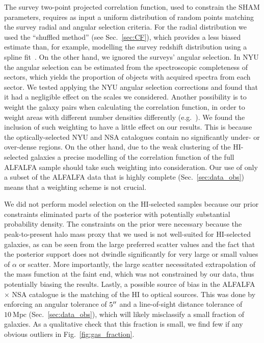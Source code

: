 \documentclass[usenatbib,useAMS]{mnras}
\newcommand{\HI}{\ensuremath{\mathrm{H}\scriptstyle\mathrm{I}}}
\newcommand{\matched}{ALFALFA $\times$ NSA }
\begin{document}
The survey two-point projected correlation function, used to constrain the \ac{SHAM} parameters, requires as input a uniform distribution of random points matching the survey radial and angular selection criteria. For the radial distribution we used the ``shuffled method'' (see Sec.~\ref{sec:CF}), which provides a less biased estimate than, for example, modelling the survey redshift distribution using a spline fit~\citep{Ross_et_al}. On the other hand, we ignored the surveys' angular selection. In \ac{NYU} the angular selection can be estimated from the spectroscopic completeness of sectors, which yields the proportion of objects with acquired spectra from each sector. We tested applying the \ac{NYU} angular selection corrections and found that it had a negligible effect on the scales we considered. Another possibility is to weight the galaxy pairs when calculating the correlation function, in order to weight areas with different number densities differently (e.g.~\citealt{Feldman}). We found the inclusion of such weighting to have a little effect on our results. This is because the optically-selected \ac{NYU} and \ac{NSA} catalogues contain no significantly under- or over-dense regions. On the other hand, due to the weak clustering of the $\HI$-selected galaxies a precise modelling of the correlation function of the full ALFALFA sample should take such weighting into consideration. Our use of only a subset of the ALFALFA data that is highly complete (Sec.~\ref{sec:data_obs}) means that a weighting scheme is not crucial.

We did not perform model selection on the $\HI$-selected samples because our prior constraints eliminated parts of the posterior with potentially substantial probability density. The constraints on the prior were necessary because the peak-to-present halo mass proxy that we used is not well-suited for $\HI$-selected galaxies, as can be seen from the large preferred scatter values and the fact that the posterior support does not dwindle significantly for very large or small values of $\alpha$ or scatter. More importantly, the large scatter necessitated extrapolation of the mass function at the faint end, which was not constrained by our data, thus potentially biasing the results. Lastly, a possible source of bias in the \matched catalogue is the matching of the $\HI$ to optical sources. This was done by enforcing an angular tolerance of $5\hbox{$^{\prime\prime}$}$ and a line-of-sight distance tolerance of $10~\mathrm{Mpc}$ (Sec.~\ref{sec:data_obs}), which will likely misclassify a small fraction of galaxies. As a qualitative check that this fraction is small, we find few if any obvious outliers in Fig.~\ref{fig:gas_fraction}.
\end{document}
